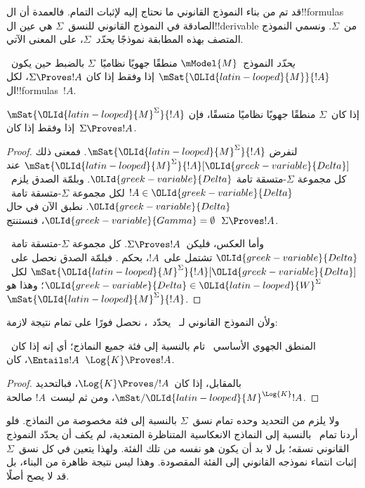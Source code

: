 \documentclass[../../../include/open-logic-section]{subfiles}
\begin{document}


قد تم من بناء النموذج القانوني ما نحتاج إليه لإثبات التمام.
فالعمدة أن ال!!{formula}s الصادقة في النموذج القانوني للنسق~$\Sigma$
هي عين ال!!{derivable} من~$\Sigma$.
ونسمي النموذج المتصف بهذه المطابقة نموذجًا \emph{يحدّد}~$\Sigma$،
على المعنى الآتي.

\begin{defn}
  \emph{يحدّد} النموذج~$\mModel{M}$ منطقًا جهويًا نظاميًا~$\Sigma$
  بالضبط حين يكون~$\mSat{{\OLId{latin-looped}{M}}}{!A}$ إذا وفقط إذا كان
  $\Sigma \Proves !A$، لكل ال!!{formula}s~$!A$.
\end{defn}

\begin{thm}[التحديد]
  إذا كان~$\Sigma$ منطقًا جهويًا نظاميًا متسقًا، فإن
  $\mSat{{\OLId{latin-looped}{M}}^\Sigma}{!A}$ إذا وفقط إذا كان~$\Sigma \Proves !A$.
\end{thm}

\begin{proof}
  لنفرض $\mSat{{\OLId{latin-looped}{M}}^\Sigma}{!A}$. فمعنى ذلك
  $\mSat{{\OLId{latin-looped}{M}}^\Sigma}{!A}[{\OLId{greek-variable}{Delta}}]$ عند كل مجموعة $\Sigma$-متسقة تامة
  ${\OLId{greek-variable}{Delta}}$. وبلمّة الصدق يلزم~$!A \in {\OLId{greek-variable}{Delta}}$ لكل مجموعة
  $\Sigma$-متسقة تامة~${\OLId{greek-variable}{Delta}}$.
  نطبق الآن 
  في حال $ {\OLId{greek-variable}{Gamma}} = \emptyset$، فنستنتج~$\Sigma \Proves !A$.

  وأما العكس، فليكن~$\Sigma \Proves !A$.
  كل مجموعة $\Sigma$-متسقة تامة~${\OLId{greek-variable}{Delta}}$ تشتمل على~$!A$،
  بحكم .
  فبلمّة الصدق نحصل على~$\mSat{{\OLId{latin-looped}{M}}^\Sigma}{!A}[{\OLId{greek-variable}{Delta}}]$ لكل~${\OLId{greek-variable}{Delta}} \in
  {\OLId{latin-looped}{W}}^\Sigma$؛ وهذا هو~$\mSat{{\OLId{latin-looped}{M}}^\Sigma}{!A}$.
\end{proof}

ولأن النموذج القانوني لـ~ يحدّد~، نحصل فورًا على تمام
 نتيجة لازمة:

\begin{cor}
  المنطق الجهوي الأساسي~ تام بالنسبة إلى فئة جميع النماذج؛
  أي إنه إذا كان~$\Entails !A$، كان~$\Log{K} \Proves !A$.
\end{cor}

\begin{proof}
  بالمقابل، إذا كان~$\Log{K} \Proves/ !A$، فبالتحديد
  $\mSat/{{\OLId{latin-looped}{M}}^{\Log{K}}}{!A}$، ومن ثم ليست~$!A$ صالحة.
\end{proof}

ولا يلزم من التحديد وحده تمام نسق~$\Sigma$ بالنسبة إلى فئة مخصوصة
من النماذج. فلو أردنا تمام~ بالنسبة إلى النماذج الانعكاسية
المتناظرة المتعدية، لم يكف أن يحدّد النموذج القانوني نسقه؛ بل لا بد
أن يكون هو نفسه من تلك الفئة. ولهذا يتعين في كل نسق~$\Sigma$
إثبات انتماء نموذجه القانوني إلى الفئة المقصودة.
وهذا ليس نتيجة ظاهرة من البناء، بل قد لا يصح أصلًا.
\end{document}
